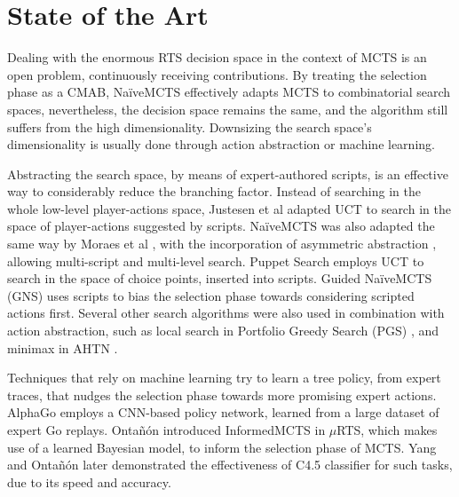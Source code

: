 \documentclass[conference]{IEEEtran}
\newcommand{\mRTS}{$\mu$RTS}
\begin{document}


\section{State of the Art}
\label{sec:state_of_the_art}


Dealing with the enormous RTS decision space in the context of MCTS is an open problem, continuously receiving contributions. By treating the selection phase as a CMAB, NaïveMCTS effectively adapts MCTS to combinatorial search spaces, nevertheless, the decision space remains the same, and the algorithm still suffers from the high dimensionality. Downsizing the search space's dimensionality is usually done through action abstraction or machine learning.

Abstracting the search space, by means of expert-authored scripts, is an effective way to considerably reduce the branching factor. Instead of searching in the whole low-level player-actions space, Justesen et al \cite{justesen_script-_2014} adapted UCT to search in the space of player-actions suggested by scripts. NaïveMCTS was also adapted the same way by Moraes et al \cite{moraes_action_2018}, with the incorporation of asymmetric abstraction \cite{moraes_asymmetric_2018}, allowing multi-script and multi-level search. Puppet Search \cite{barriga_puppet_2015} employs UCT to search in the space of choice points, inserted into scripts. Guided NaïveMCTS (GNS) \cite{yang_guiding_2019} uses scripts to bias the selection phase towards considering scripted actions first. Several other search algorithms were also used in combination with action abstraction, such as local search in Portfolio Greedy Search (PGS) \cite{churchill_portfolio_2013}, and minimax in AHTN \cite{ontanon_adversarial_2015}.

Techniques that rely on machine learning try to learn a tree policy, from expert traces, that nudges the selection phase towards more promising expert actions. AlphaGo \cite{silver_mastering_2016} employs a CNN-based policy network, learned from a large dataset of expert Go replays. Ontañón introduced InformedMCTS in \mRTS{}, which makes use of a learned Bayesian model, to inform the selection phase of MCTS. Yang and Ontañón \cite{yang_extracting_2019} later demonstrated the effectiveness of C4.5 classifier for such tasks, due to its speed and accuracy.
\end{document}
